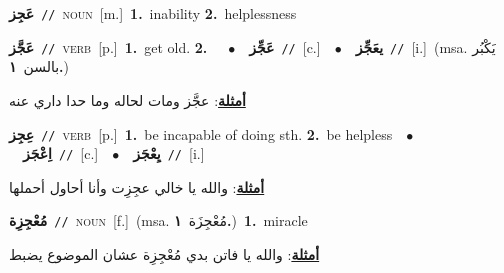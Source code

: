 \documentclass[10pt,a4paper,twoside]{article} %
\begin{document}
\begin{multicols}{2}
{\setlength\topsep{0pt}\textbf{\foreignlanguage{arabic}{عَجِز}}\ {\color{gray}\texttt{//}\color{black}}\ \textsc{noun}\ [m.]\ \textbf{1.}~inability  \textbf{2.}~helplessness\ } \vspace{2mm}

{\setlength\topsep{0pt}\textbf{\foreignlanguage{arabic}{عَجَّز}}\ {\color{gray}\texttt{//}\color{black}}\ \textsc{verb}\ [p.]\ \textbf{1.}~get old.  \textbf{2.}~\ \ $\bullet$\ \ \setlength\topsep{0pt}\textbf{\foreignlanguage{arabic}{عَجِّز}}\ {\color{gray}\texttt{//}\color{black}}\ [c.]\ \ $\bullet$\ \ \setlength\topsep{0pt}\textbf{\foreignlanguage{arabic}{يعَجِّز}}\ {\color{gray}\texttt{//}\color{black}}\ [i.]\ \color{gray}(msa. \foreignlanguage{arabic}{يَكْبُر بالسن}~\foreignlanguage{arabic}{\textbf{١.}})\color{black}\  \begin{flushright}\color{gray}\foreignlanguage{arabic}{\textbf{\underline{\foreignlanguage{arabic}{أمثلة}}}: عجَّز ومات لحاله وما حدا داري عنه}\end{flushright}\color{black}} \vspace{2mm}

{\setlength\topsep{0pt}\textbf{\foreignlanguage{arabic}{عِجِز}}\ {\color{gray}\texttt{//}\color{black}}\ \textsc{verb}\ [p.]\ \textbf{1.}~be incapable of doing sth.  \textbf{2.}~be helpless\ \ $\bullet$\ \ \setlength\topsep{0pt}\textbf{\foreignlanguage{arabic}{اِعْجَز}}\ {\color{gray}\texttt{//}\color{black}}\ [c.]\ \ $\bullet$\ \ \setlength\topsep{0pt}\textbf{\foreignlanguage{arabic}{يِعْجَز}}\ {\color{gray}\texttt{//}\color{black}}\ [i.]\  \begin{flushright}\color{gray}\foreignlanguage{arabic}{\textbf{\underline{\foreignlanguage{arabic}{أمثلة}}}: والله يا خالي عجِزِت وأنا أحاول أحملها}\end{flushright}\color{black}} \vspace{2mm}

{\setlength\topsep{0pt}\textbf{\foreignlanguage{arabic}{مُعْجِزِة}}\ {\color{gray}\texttt{//}\color{black}}\ \textsc{noun}\ [f.]\ \color{gray}(msa. \foreignlanguage{arabic}{مُعْجِزَة}~\foreignlanguage{arabic}{\textbf{١.}})\color{black}\ \textbf{1.}~miracle\  \begin{flushright}\color{gray}\foreignlanguage{arabic}{\textbf{\underline{\foreignlanguage{arabic}{أمثلة}}}: والله يا فاتن بدي مُعْجِزِة عشان الموضوع يضبط}\end{flushright}\color{black}} \vspace{2mm}


\end{multicols}
\end{document}
